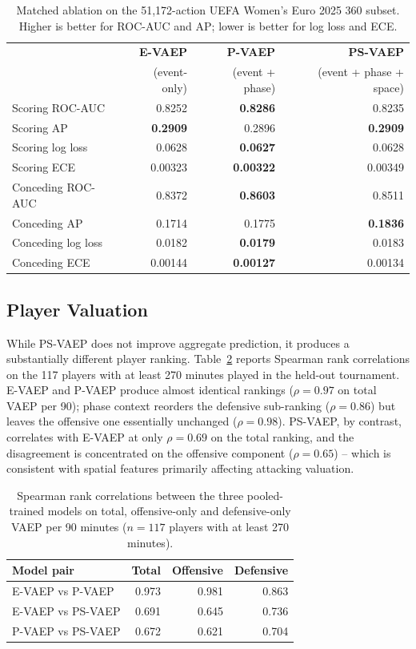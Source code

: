 \documentclass[runningheads]{llncs}
\begin{document}
\begin{table}[tbp]
\footnotesize
\centering
\caption{Matched ablation on the 51,172-action UEFA Women's Euro 2025 360 subset. Higher is better for ROC-AUC and AP; lower is better for log loss and ECE.}
\label{tab:ablation}
\begin{tabular}{lrrr}
\toprule
& \textbf{E-VAEP} & \textbf{P-VAEP} & \textbf{PS-VAEP} \\
& (event-only) & (event + phase) & (event + phase + space) \\
\midrule
Scoring ROC-AUC & 0.8252 & \textbf{0.8286} & 0.8235 \\
Scoring AP & \textbf{0.2909} & 0.2896 & \textbf{0.2909} \\
Scoring log loss & 0.0628 & \textbf{0.0627} & 0.0628 \\
Scoring ECE & 0.00323 & \textbf{0.00322} & 0.00349 \\
\midrule
Conceding ROC-AUC & 0.8372 & \textbf{0.8603} & 0.8511 \\
Conceding AP & 0.1714 & 0.1775 & \textbf{0.1836} \\
Conceding log loss & 0.0182 & \textbf{0.0179} & 0.0183 \\
Conceding ECE & 0.00144 & \textbf{0.00127} & 0.00134 \\
\bottomrule
\end{tabular}
\end{table}

\subsection{Player Valuation}

While PS-VAEP does not improve aggregate prediction, it produces a substantially different player ranking. Table~\ref{tab:ranks} reports Spearman rank correlations on the 117 players with at least 270 minutes played in the held-out tournament. E-VAEP and P-VAEP produce almost identical rankings ($\rho = 0.97$ on total VAEP per 90); phase context reorders the defensive sub-ranking ($\rho = 0.86$) but leaves the offensive one essentially unchanged ($\rho = 0.98$). PS-VAEP, by contrast, correlates with E-VAEP at only $\rho = 0.69$ on the total ranking, and the disagreement is concentrated on the offensive component ($\rho = 0.65$) -- which is consistent with spatial features primarily affecting attacking valuation.

\begin{table}[tbp]
\footnotesize
\centering
\caption{Spearman rank correlations between the three pooled-trained models on total, offensive-only and defensive-only VAEP per 90 minutes ($n = 117$ players with at least 270 minutes).\label{tab:ranks}}
\begin{tabular}{lrrr}
\toprule
\textbf{Model pair} & \textbf{Total} & \textbf{Offensive} & \textbf{Defensive} \\
\midrule
E-VAEP vs P-VAEP & 0.973 & 0.981 & 0.863 \\
E-VAEP vs PS-VAEP & 0.691 & 0.645 & 0.736 \\
P-VAEP vs PS-VAEP & 0.672 & 0.621 & 0.704 \\
\bottomrule
\end{tabular}
\end{table}
\end{document}
